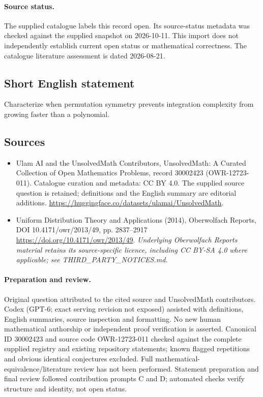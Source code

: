 \documentclass[11pt]{article}
\begin{document}
\paragraph{Source status.}
The supplied catalogue labels this record open. Its source-status metadata was checked against the supplied snapshot on 2026-10-11. This import does not independently establish current open status or mathematical correctness. The catalogue literature assessment is dated 2026-08-21.
\subsection{Short English statement}
Characterize when permutation symmetry prevents integration complexity from growing faster than a polynomial.
\subsection{Sources}
\begin{itemize}
\item[\hypertarget{source:30002423:1}{S1}] Ulam AI and the UnsolvedMath Contributors, UnsolvedMath: A Curated Collection of Open Mathematics Problems, record 30002423 (OWR-12723-011). Catalogue curation and metadata: CC BY 4.0. The supplied source question is retained; definitions and the English summary are editorial additions.
\url{https://huggingface.co/datasets/ulamai/UnsolvedMath}.
\item[\hypertarget{source:30002423:2}{S2}] Uniform Distribution Theory and Applications (2014), Oberwolfach Reports, DOI 10.4171/owr/2013/49, pp. 2837--2917
\url{https://doi.org/10.4171/owr/2013/49}.
\textit{Underlying Oberwolfach Reports material retains its source-specific licence, including CC BY-SA 4.0 where applicable; see THIRD\_PARTY\_NOTICES.md.}
\end{itemize}
\paragraph{Preparation and review.}
Original question attributed to the cited source and UnsolvedMath contributors. Codex (GPT-6; exact serving revision not exposed) assisted with definitions, English summaries, source inspection and formatting. No new human mathematical authorship or independent proof verification is asserted. Canonical ID 30002423 and source code OWR-12723-011 checked against the complete supplied registry and existing repository statements; known flagged repetitions and obvious identical conjectures excluded. Full mathematical-equivalence/literature review has not been performed. Statement preparation and final review followed contribution prompts C and D; automated checks verify structure and identity, not open status.
\label{end:30002423}
\end{document}
